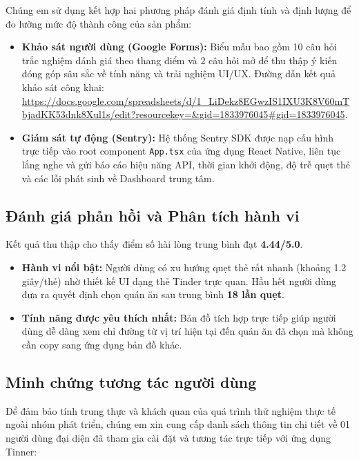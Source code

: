 Chúng em sử dụng kết hợp hai phương pháp đánh giá định tính và định lượng để đo lường mức độ thành công của sản phẩm:

\begin{itemize}
    \item \textbf{Khảo sát người dùng (Google Forms):} Biểu mẫu bao gồm 10 câu hỏi trắc nghiệm đánh giá theo thang điểm và 2 câu hỏi mở để thu thập ý kiến đóng góp sâu sắc về tính năng và trải nghiệm UI/UX. Đường dẫn kết quả khảo sát công khai: \url{https://docs.google.com/spreadsheets/d/1_LiDekz8EGwzIS1IXU3K8V60mTbjadKK53dnk8Xul1s/edit?resourcekey=&gid=1833976045#gid=1833976045}.
    \item \textbf{Giám sát tự động (Sentry):} Hệ thống Sentry SDK được nạp cấu hình trực tiếp vào root component \texttt{App.tsx} của ứng dụng React Native, liên tục lắng nghe và gửi báo cáo hiệu năng API, thời gian khởi động, độ trễ quẹt thẻ và các lỗi phát sinh về Dashboard trung tâm.
\end{itemize}

\subsection{Đánh giá phản hồi và Phân tích hành vi}
\label{subsec:feedback_analysis}

Kết quả thu thập cho thấy điểm số hài lòng trung bình đạt \textbf{4.44/5.0}. 
\begin{itemize}
    \item \textbf{Hành vi nổi bật:} Người dùng có xu hướng quẹt thẻ rất nhanh (khoảng 1.2 giây/thẻ) nhờ thiết kế UI dạng thẻ Tinder trực quan. Hầu hết người dùng đưa ra quyết định chọn quán ăn sau trung bình \textbf{18 lần quẹt}.
    \item \textbf{Tính năng được yêu thích nhất:} Bản đồ tích hợp trực tiếp giúp người dùng dễ dàng xem chỉ đường từ vị trí hiện tại đến quán ăn đã chọn mà không cần copy sang ứng dụng bản đồ khác.
\end{itemize}

\subsection{Minh chứng tương tác người dùng}
\label{subsec:user_evidence}

Để đảm bảo tính trung thực và khách quan của quá trình thử nghiệm thực tế ngoài nhóm phát triển, chúng em xin cung cấp danh sách thông tin chi tiết về 01 người dùng đại diện đã tham gia cài đặt và tương tác trực tiếp với ứng dụng Tinner:

